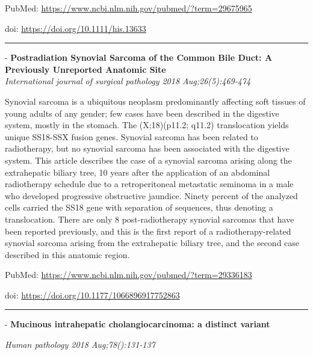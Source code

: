 \documentclass[]{article}
\begin{document}
PubMed: \url{https://www.ncbi.nlm.nih.gov/pubmed/?term=29675965}

doi: \url{https://doi.org/10.1111/his.13633}

{}

{}

\begin{center}\rule{0.5\linewidth}{\linethickness}\end{center}

 - \textbf{Postradiation Synovial Sarcoma of the Common Bile Duct: A
Previously Unreported Anatomic Site}\\
 \emph{International journal of surgical pathology 2018
Aug;26(5):469-474}

Synovial sarcoma is a ubiquitous neoplasm predominantly affecting soft
tissues of young adults of any gender; few cases have been described in
the digestive system, mostly in the stomach. The (X;18)(p11.2; q11.2)
translocation yields unique SS18-SSX fusion genes. Synovial sarcoma has
been related to radiotherapy, but no synovial sarcoma has been
associated with the digestive system. This article describes the case of
a synovial sarcoma arising along the extrahepatic biliary tree, 10 years
after the application of an abdominal radiotherapy schedule due to a
retroperitoneal metastatic seminoma in a male who developed progressive
obstructive jaundice. Ninety percent of the analyzed cells carried the
SS18 gene with separation of sequences, thus denoting a translocation.
There are only 8 post-radiotherapy synovial sarcomas that have been
reported previously, and this is the first report of a
radiotherapy-related synovial sarcoma arising from the extrahepatic
biliary tree, and the second case described in this anatomic region.

PubMed: \url{https://www.ncbi.nlm.nih.gov/pubmed/?term=29336183}

doi: \url{https://doi.org/10.1177/1066896917752863}

{}

{}

\begin{center}\rule{0.5\linewidth}{\linethickness}\end{center}

 - \textbf{Mucinous intrahepatic cholangiocarcinoma: a distinct variant}

\emph{Human pathology 2018 Aug;78():131-137}
\end{document}
